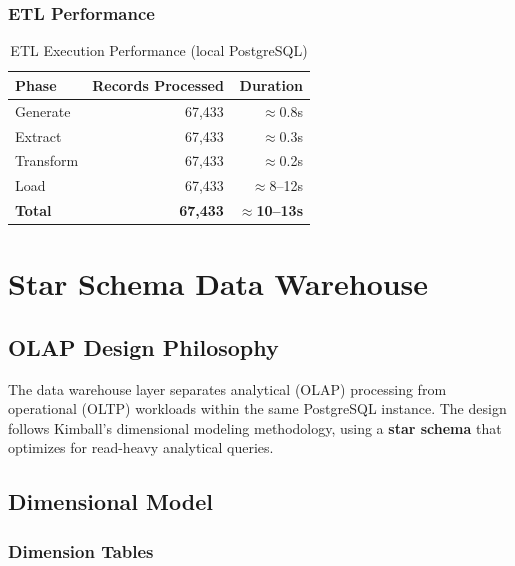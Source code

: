 \documentclass[12pt, a4paper]{report}
\begin{document}
\subsection{ETL Performance}

\begin{table}[H]
\centering
\caption{ETL Execution Performance (local PostgreSQL)}
\label{tab:etl_perf}
\begin{tabular}{@{}lrr@{}}
\toprule
\textbf{Phase} & \textbf{Records Processed} & \textbf{Duration} \\
\midrule
Generate    & 67,433  & $\approx$0.8s \\
Extract     & 67,433  & $\approx$0.3s \\
Transform   & 67,433  & $\approx$0.2s \\
Load        & 67,433  & $\approx$8--12s \\
\midrule
\textbf{Total} & \textbf{67,433} & \textbf{$\approx$10--13s} \\
\bottomrule
\end{tabular}
\end{table}

\chapter{Star Schema Data Warehouse}

\section{OLAP Design Philosophy}

The data warehouse layer separates analytical (OLAP) processing from operational (OLTP) workloads within the same PostgreSQL instance. The design follows Kimball's dimensional modeling methodology, using a \textbf{star schema} that optimizes for read-heavy analytical queries.

\section{Dimensional Model}

\subsection{Dimension Tables}
\end{document}
